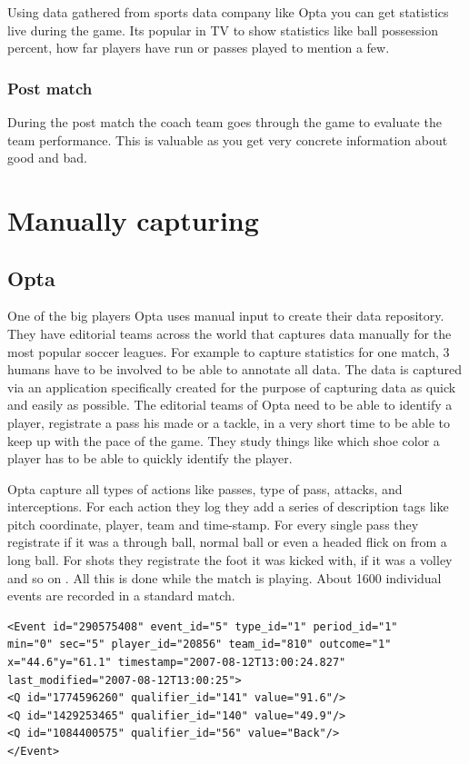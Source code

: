 Using data gathered from sports data company like Opta you can get statistics live during the game. Its popular in TV to show statistics like ball possession percent, how far players have run or passes played to mention a few. 

\subsubsection{Post match}

During the post match the coach team goes through the game to evaluate the team performance. This is valuable as you get very concrete information about good and bad. 

\section{Manually capturing }

\subsection{Opta }


One of the big players Opta uses manual input to create their data repository. They have editorial teams across the world that captures data manually for the most popular soccer leagues. For example to capture statistics for one match, 3 humans have to be involved to be able to annotate all data. The data is captured via an application specifically created for the purpose of capturing data as quick and easily as possible. The editorial teams of Opta need to be able to identify a player, registrate a pass his made or a tackle, in a very short time to be able to keep up with the pace of the game. They study things like which shoe color a player has to be able to quickly identify the player.

Opta capture all types of actions like passes, type of pass, attacks, and interceptions. For each action they log they add a series of description tags like pitch coordinate, player, team and time-stamp. For every single pass they registrate if it was a through ball, normal ball or even a headed flick on from a long ball. For shots they registrate the foot it was kicked with, if it was a volley and so on . All this is done while the match is playing. About 1600 individual events are recorded in a standard match. 

\begin{lstlisting}
<Event id="290575408" event_id="5" type_id="1" period_id="1" 
min="0" sec="5" player_id="20856" team_id="810" outcome="1" 
x="44.6"y="61.1" timestamp="2007-08-12T13:00:24.827" 
last_modified="2007-08-12T13:00:25">
<Q id="1774596260" qualifier_id="141" value="91.6"/>
<Q id="1429253465" qualifier_id="140" value="49.9"/>
<Q id="1084400575" qualifier_id="56" value="Back"/>
</Event>
\end{lstlisting}

